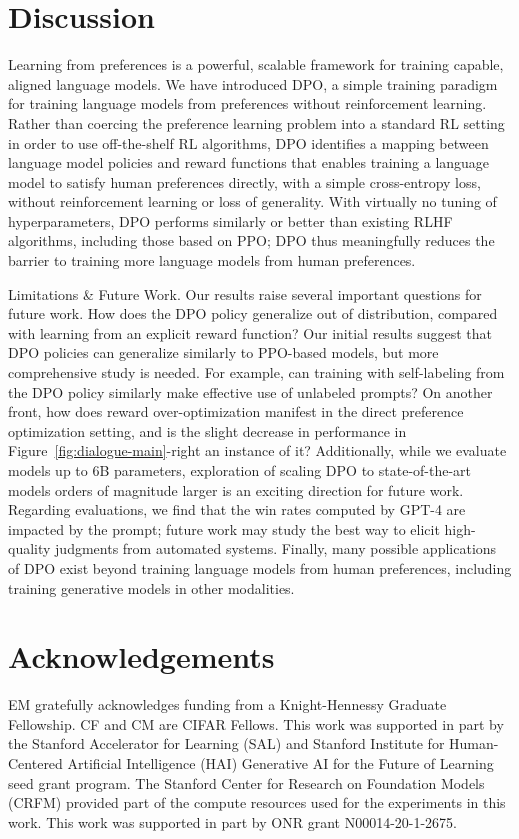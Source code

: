 \documentclass{article}
\begin{document}
\section{Discussion}
Learning from preferences is a powerful, scalable framework for training capable, aligned language models. We have introduced DPO, a simple training paradigm for training language models from preferences without reinforcement learning. Rather than coercing the preference learning problem into a standard RL setting in order to use off-the-shelf RL algorithms, DPO identifies a mapping between language model policies and reward functions that enables training a language model to satisfy human preferences directly, with a simple cross-entropy loss, without reinforcement learning or loss of generality. With virtually no tuning of hyperparameters, DPO performs similarly or better than existing RLHF algorithms, including those based on PPO; DPO thus meaningfully reduces the barrier to training more language models from human preferences.

Limitations \& Future Work. Our results raise several important questions for future work. How does the DPO policy generalize out of distribution, compared with learning from an explicit reward function? Our initial results suggest that DPO policies can generalize similarly to PPO-based models, but more comprehensive study is needed. For example, can training with self-labeling from the DPO policy similarly make effective use of unlabeled prompts? On another front, how does reward over-optimization manifest in the direct preference optimization setting, and is the slight decrease in performance in Figure~\ref{fig:dialogue-main}-right an instance of it? Additionally, while we evaluate models up to 6B parameters, exploration of scaling DPO to state-of-the-art models orders of magnitude larger is an exciting direction for future work. Regarding evaluations, we find that the win rates computed by GPT-4 are impacted by the prompt; future work may study the best way to elicit high-quality judgments from automated systems. Finally, many possible applications of DPO exist beyond training language models from human preferences, including training generative models in other modalities.

\section*{Acknowledgements}
EM gratefully acknowledges funding from a Knight-Hennessy Graduate Fellowship. CF and CM are CIFAR Fellows. This work was supported in part by the Stanford Accelerator for Learning (SAL) and Stanford Institute for Human-Centered Artificial Intelligence (HAI) Generative AI for the Future of Learning seed grant program. The Stanford Center for Research on Foundation Models (CRFM) provided part of the compute resources used for the experiments in this work. This work was supported in part by ONR grant N00014-20-1-2675.
\end{document}
